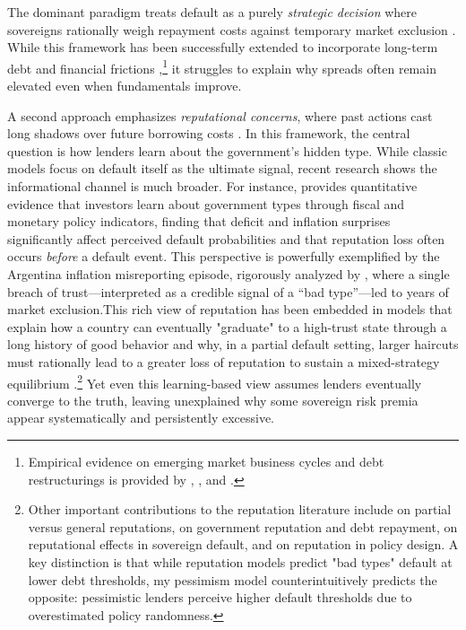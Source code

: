 \documentclass[12pt]{article}
\theoremstyle{plain}
\begin{document}
The dominant paradigm treats default as a purely \textit{strategic decision}
where sovereigns rationally weigh repayment costs against temporary market
exclusion \citep{EatonGersovitz1981, AguiarGopinath2007, Arellano2008}. While
this framework has been successfully extended to incorporate long-term debt and
financial frictions \citep{HatchondoMartinez2009, ChatterjeeEyigungor2012,
	MendozaYue2012},\footnote{Empirical evidence on emerging market business cycles
	and debt restructurings is provided by \citep{NeumeyerPerri2005},
	\citep{CrucesTrebesch2013}, and \citep{ArellanoRamanarayanan2012}.} it
struggles to explain why spreads often remain elevated even when fundamentals
improve.

A second approach emphasizes \textit{reputational concerns}, where past actions
cast long shadows over future borrowing costs \citep{ColeDowEnglish1995,
	Phelan2006}. In this framework, the central question is how lenders learn about
the government's hidden type. While classic models focus on default itself as
the ultimate signal, recent research shows the informational channel is much
broader. For instance, \citep{Fourakis2021} provides quantitative evidence that
investors learn about government types through fiscal and monetary policy
indicators, finding that deficit and inflation surprises significantly affect
perceived default probabilities and that reputation loss often occurs
\textit{before} a default event. This perspective is powerfully exemplified by
the Argentina inflation misreporting episode, rigorously analyzed by
\citep{MorelliMoretti2023}, where a single breach of trust—interpreted as a
credible signal of a ``bad type''—led to years of market exclusion.This rich
view of reputation has been embedded in models that explain how a country can
eventually "graduate" to a high-trust state through a long history of good
behavior \citep{AmadorPhelan2021} and why, in a partial default setting, larger
haircuts must rationally lead to a greater loss of reputation to sustain a
mixed-strategy equilibrium \citep{AmadorPhelan2023}.\footnote{Other important
	contributions to the reputation literature include \citep{ColeKehoe1998} on
	partial versus general reputations, \citep{DErasmo2011} on government
	reputation and debt repayment, \citep{EgorovFabinger2016} on reputational
	effects in sovereign default, and \citep{DovisKirpalani2020,
		DovisKirpalani2021} on reputation in policy design. A key distinction is that
	while reputation models predict "bad types" default at lower debt thresholds,
	my pessimism model counterintuitively predicts the opposite: pessimistic
	lenders perceive higher default thresholds due to overestimated policy
	randomness.} Yet even this learning-based view assumes lenders eventually
converge to the truth, leaving unexplained why some sovereign risk premia
appear systematically and persistently excessive.
\end{document}
